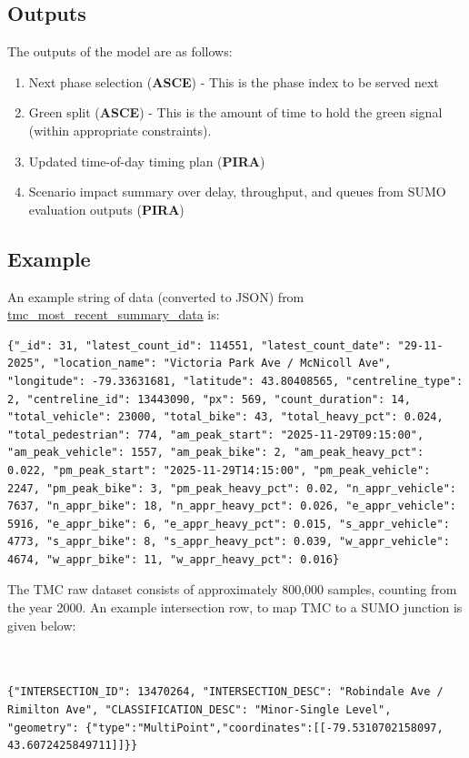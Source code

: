 \documentclass[10pt,twocolumn]{article}
\begin{document}
\subsection{Outputs}
The outputs of the model are as follows:
\begin{enumerate}
    \item Next phase selection (\textbf{ASCE}) - This is the phase index to be served next
    \item Green split (\textbf{ASCE}) - This is the amount of time to hold the green signal (within appropriate constraints).
    \item Updated time-of-day timing plan (\textbf{PIRA})
    \item Scenario impact summary over delay, throughput, and queues from SUMO evaluation outputs (\textbf{PIRA})
\end{enumerate}

\subsection{Example}
An example string of data (converted to JSON) from
\href{https://data.urbandatacentre.ca/catalogue/city-toronto-traffic-volumes-at-intersections-for-all-modes/resource/42a2a3b1-c8d5-4611-8e32-ba99314d5fbb}{tmc\_most\_recent\_summary\_data}
\cite{udc_tmc_resource}
is:

\begin{lstlisting}
{"_id": 31, "latest_count_id": 114551, "latest_count_date": "29-11-2025", "location_name": "Victoria Park Ave / McNicoll Ave", "longitude": -79.33631681, "latitude": 43.80408565, "centreline_type": 2, "centreline_id": 13443090, "px": 569, "count_duration": 14, "total_vehicle": 23000, "total_bike": 43, "total_heavy_pct": 0.024, "total_pedestrian": 774, "am_peak_start": "2025-11-29T09:15:00", "am_peak_vehicle": 1557, "am_peak_bike": 2, "am_peak_heavy_pct": 0.022, "pm_peak_start": "2025-11-29T14:15:00", "pm_peak_vehicle": 2247, "pm_peak_bike": 3, "pm_peak_heavy_pct": 0.02, "n_appr_vehicle": 7637, "n_appr_bike": 18, "n_appr_heavy_pct": 0.026, "e_appr_vehicle": 5916, "e_appr_bike": 6, "e_appr_heavy_pct": 0.015, "s_appr_vehicle": 4773, "s_appr_bike": 8, "s_appr_heavy_pct": 0.039, "w_appr_vehicle": 4674, "w_appr_bike": 11, "w_appr_heavy_pct": 0.016}
\end{lstlisting}

The TMC raw dataset consists of approximately 800{,}000 samples, counting from the year 2000. An example intersection row, to map TMC to a SUMO junction is given below: \\\\\\
\begin{lstlisting}
{"INTERSECTION_ID": 13470264, "INTERSECTION_DESC": "Robindale Ave / Rimilton Ave", "CLASSIFICATION_DESC": "Minor-Single Level", "geometry": {"type":"MultiPoint","coordinates":[[-79.5310702158097, 43.6072425849711]]}}
\end{lstlisting}
\end{document}
